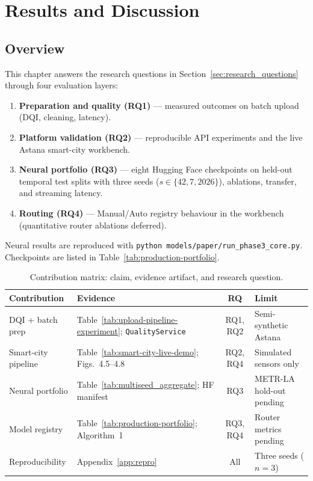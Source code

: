 %
%

\chapter{Results and Discussion}
\label{chap:results}

\section{Overview}
\label{sec:exp_overview}

This chapter answers the research questions in Section~\ref{sec:research_questions} through four evaluation layers:
\begin{enumerate}
  \item \textbf{Preparation and quality (RQ1)} --- measured outcomes on batch upload (DQI, cleaning, latency).
  \item \textbf{Platform validation (RQ2)} --- reproducible API experiments and the live Astana smart-city workbench.
  \item \textbf{Neural portfolio (RQ3)} --- eight Hugging Face checkpoints on held-out temporal test splits with three seeds ($s\in\{42,7,2026\}$), ablations, transfer, and streaming latency.
  \item \textbf{Routing (RQ4)} --- Manual/Auto registry behaviour in the workbench (quantitative router ablations deferred).
\end{enumerate}

Neural results are reproduced with \texttt{python models/paper/run\_phase3\_core.py}. Checkpoints are listed in Table~\ref{tab:production-portfolio}.

\begin{table}[H]
  \centering
  \caption{Contribution matrix: claim, evidence artifact, and research question.}
  \label{tab:contribution_matrix}
  \small
  \begin{tabular}{@{}p{2.8cm}p{4.2cm}cp{3.6cm}@{}}
    \toprule
    \textbf{Contribution} & \textbf{Evidence} & \textbf{RQ} & \textbf{Limit} \\
    \midrule
    DQI + batch prep & Table~\ref{tab:upload-pipeline-experiment}; \texttt{QualityService} & RQ1, RQ2 & Semi-synthetic Astana \\
    Smart-city pipeline & Table~\ref{tab:smart-city-live-demo}; Figs.~4.5--4.8 & RQ2, RQ4 & Simulated sensors only \\
    Neural portfolio & Table~\ref{tab:multiseed_aggregate}; HF manifest & RQ3 & METR-LA hold-out pending \\
    Model registry & Table~\ref{tab:production-portfolio}; Algorithm~1 & RQ3, RQ4 & Router metrics pending \\
    Reproducibility & Appendix~\ref{app:repro} & All & Three seeds ($n{=}3$) \\
    \bottomrule
  \end{tabular}
\end{table}

